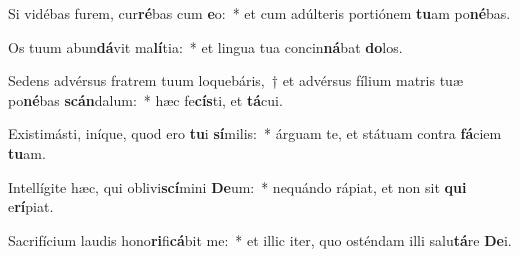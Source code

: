 \item Si vidébas furem, cur\textbf{ré}bas cum \textbf{e}o:~* et cum adúlteris portiónem \textbf{tu}am po\textbf{né}bas.
\item Os tuum abun\textbf{dá}vit ma\textbf{lí}tia:~* et lingua tua concin\textbf{ná}bat \textbf{do}los.
\item Sedens advérsus fratrem tuum loquebáris,~† et advérsus fílium matris tuæ po\textbf{né}bas \textbf{scán}dalum:~* hæc fe\textbf{cís}ti, et \textbf{tá}cui.
\item Existimásti, iníque, quod ero \textbf{tu}i \textbf{sí}milis:~* árguam te, et státuam contra \textbf{fá}ciem \textbf{tu}am.
\item Intellígite hæc, qui oblivi\textbf{scí}mini \textbf{De}um:~* nequándo rápiat, et non sit \textbf{qui} e\textbf{rí}piat.
\item Sacrifícium laudis hono\textbf{ri}fi\textbf{cá}bit me:~* et illic iter, quo osténdam illi salu\textbf{tá}re \textbf{De}i.
